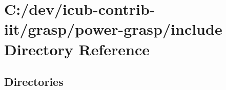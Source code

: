 \section{C\+:/dev/icub-\/contrib-\/iit/grasp/power-\/grasp/include Directory Reference}
\label{dir_efbb52896d1cef1f745127e9634ee653}
\subsection*{Directories}
\begin{DoxyCompactItemize}
\end{DoxyCompactItemize}
